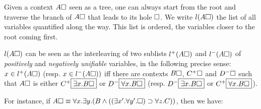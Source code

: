 \begin{definition}
Given a context $A\square$ seen as a tree, one can always start from
the root and traverse the branch of $A\square$ that leads to its hole
$\square$. We write $l(A\square)$ the list of all variables
quantified along the way. This list is ordered, the variables closer
to the root coming first.

$l(A\square)$ can be seen as the interleaving of two sublists
$l^+(A\square)$ and $l^-(A\square)$ of \emph{positively} and
\emph{negatively unifiable} variables, in the following precise sense:
$x \in l^+(A\square)$ (resp. $x \in l^-(A\square))$ iff there
are contexts $B\square$, $C^+\square$ and $D^-\square$ such that
$A\square$ is either $C^+\fbox{$\exists x. B\square$}$ or
$D^-\fbox{$\forall x. B\square$}$ (resp. $D^-\fbox{$\exists x. B\square$}$
or $C^+\fbox{$\forall x. B\square$}$).

For instance, if $A\square \equiv \forall x. \exists y. (B \land ((\exists x'.
\forall y'. \square) \supset \forall z. C))$, then we have:


  

\end{definition}
